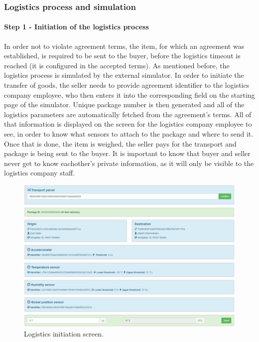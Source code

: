 \subsubsection{Logistics process and simulation}

\paragraph{Step 1 - Initiation of the logistics process}

In order not to violate agreement terms, the item, for which an agreement was established, is required to be sent to the buyer, before the logistics timeout is reached (it is configured in the accepted terms). As mentioned before, the logistics process is simulated by the external simulator. In order to initiate the transfer of goods, the seller needs to provide agreement identifier to the logistics company employee, who then enters it into the corresponding field on the starting page of the simulator. Unique package number is then generated and all of the logistics parameters are automatically fetched from the agreement's terms. All of that information is displayed on the screen for the logistics company employee to see, in order to know what sensors to attach to the package and where to send it. Once that is done, the item is weighed, the seller pays for the transport and package is being sent to the buyer. It is important to know that buyer and seller never get to know eachother's private information, as it will only be visible to the logistics company staff.

\begin{figure}[H]
\centering
\includegraphics[scale=0.345]{app_screens/simulator_init.png}
\caption{Logistics initiation screen.}
\label{fig:siminit}
\end{figure}

